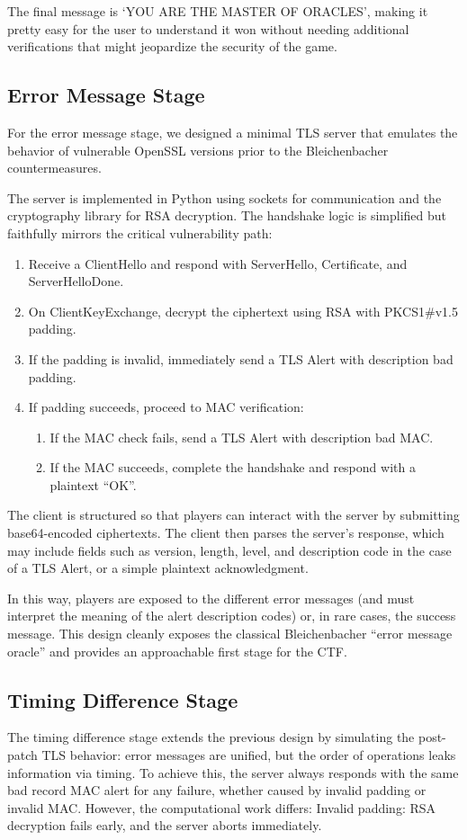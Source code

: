 \documentclass[sigconf]{acmart}
\begin{document}
The final message is ‘YOU ARE THE MASTER OF ORACLES’, making it pretty easy for the user to understand it won without needing additional verifications that might jeopardize the security of the game. 

\subsection{Error Message Stage}
For the error message stage, we designed a minimal TLS server that emulates the behavior of vulnerable OpenSSL versions prior to the Bleichenbacher countermeasures.

The server is implemented in Python using sockets for communication and the cryptography library for RSA decryption. The handshake logic is simplified but faithfully mirrors the critical vulnerability path:
\begin{enumerate}
    \item Receive a ClientHello and respond with ServerHello, Certificate, and ServerHelloDone.
    \item On ClientKeyExchange, decrypt the ciphertext using RSA with PKCS1\#v1.5 padding.
    \item If the padding is invalid, immediately send a TLS Alert with description bad padding.
    \item If padding succeeds, proceed to MAC verification:
    \begin{enumerate}
        \item If the MAC check fails, send a TLS Alert with description bad MAC.
        \item If the MAC succeeds, complete the handshake and respond with a plaintext “OK”.
    \end{enumerate}
\end{enumerate}

The client is structured so that players can interact with the server by submitting base64-encoded ciphertexts. The client then parses the server’s response, which may include fields such as version, length, level, and description code in the case of a TLS Alert, or a simple plaintext acknowledgment.

In this way, players are exposed to the different error messages (and must interpret the meaning of the alert description codes) or, in rare cases, the success message. This design cleanly exposes the classical Bleichenbacher “error message oracle” and provides an approachable first stage for the CTF.

\subsection{Timing Difference Stage}
The timing difference stage extends the previous design by simulating the post-patch TLS behavior: error messages are unified, but the order of operations leaks information via timing. To achieve this, the server always responds with the same bad record MAC alert for any failure, whether caused by invalid padding or invalid MAC. However, the computational work differs:
Invalid padding: RSA decryption fails early, and the server aborts immediately.
\end{document}
